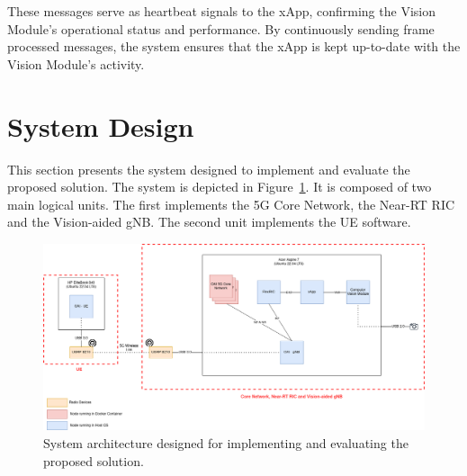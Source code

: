 \begin{table}[H]
    \caption{Components of the Frame Processed Message payload}
    \label{tab:frame_proc_pay}
    \centering
\end{table}

These messages serve as heartbeat signals to the xApp, confirming the Vision Module's operational status and performance.
By continuously sending frame processed messages, the system ensures that the xApp is kept up-to-date with the Vision Module's activity.


\section{System Design}\label{sec:design}

This section presents the system designed to implement and evaluate the proposed solution.
The system is depicted in Figure~\ref{fig:design_arch}.
It is composed of two main logical units.
The first implements the 5G Core Network, the Near-RT RIC and the Vision-aided gNB\@.
The second unit implements the UE software.


\begin{figure}[H]
    \centering
    \includegraphics[width=0.7\linewidth]{figures/System Arch.drawio}
    \caption[System architecture designed for implementing and evaluating the proposed solution]{System architecture designed for implementing and evaluating the proposed solution.}
    \label{fig:design_arch}
\end{figure}

